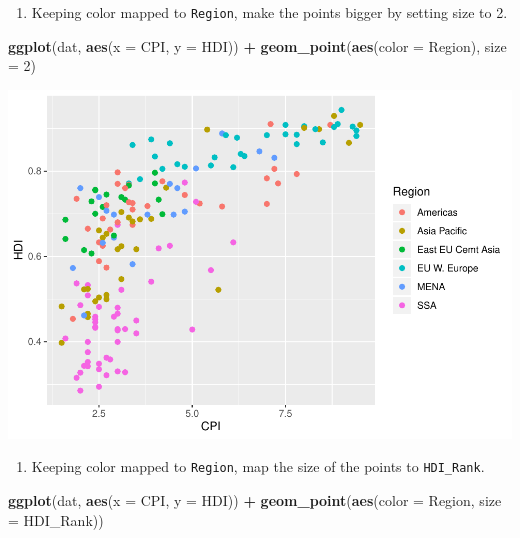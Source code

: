 \documentclass[]{book}
\newenvironment{Shaded}{\begin{snugshade}}{\end{snugshade}}
\newcommand{\DataTypeTok}[1]{\textcolor[rgb]{0.13,0.29,0.53}{#1}}
\newcommand{\DecValTok}[1]{\textcolor[rgb]{0.00,0.00,0.81}{#1}}
\newcommand{\KeywordTok}[1]{\textcolor[rgb]{0.13,0.29,0.53}{\textbf{#1}}}
\newcommand{\NormalTok}[1]{#1}
\newcommand{\OperatorTok}[1]{\textcolor[rgb]{0.81,0.36,0.00}{\textbf{#1}}}
\newcommand{\StringTok}[1]{\textcolor[rgb]{0.31,0.60,0.02}{#1}}
\providecommand{\tightlist}{%
  \setlength{\itemsep}{0pt}\setlength{\parskip}{0pt}}
\begin{document}
\begin{enumerate}
\def\labelenumi{\arabic{enumi}.}
\setcounter{enumi}{3}
\tightlist
\item
  Keeping color mapped to \texttt{Region}, make the points bigger by setting size to 2.
\end{enumerate}

\begin{Shaded}
\begin{Highlighting}[]
\KeywordTok{ggplot}\NormalTok{(dat, }\KeywordTok{aes}\NormalTok{(}\DataTypeTok{x =}\NormalTok{ CPI, }\DataTypeTok{y =}\NormalTok{ HDI)) }\OperatorTok{+}
\StringTok{  }\KeywordTok{geom_point}\NormalTok{(}\KeywordTok{aes}\NormalTok{(}\DataTypeTok{color =}\NormalTok{ Region), }\DataTypeTok{size =} \DecValTok{2}\NormalTok{)}
\end{Highlighting}
\end{Shaded}

\includegraphics{R/Rgraphics/figures/unnamed-chunk-162-1.pdf}

\begin{enumerate}
\def\labelenumi{\arabic{enumi}.}
\setcounter{enumi}{4}
\tightlist
\item
  Keeping color mapped to \texttt{Region}, map the size of the points to \texttt{HDI\_Rank}.
\end{enumerate}

\begin{Shaded}
\begin{Highlighting}[]
\KeywordTok{ggplot}\NormalTok{(dat, }\KeywordTok{aes}\NormalTok{(}\DataTypeTok{x =}\NormalTok{ CPI, }\DataTypeTok{y =}\NormalTok{ HDI)) }\OperatorTok{+}
\KeywordTok{geom_point}\NormalTok{(}\KeywordTok{aes}\NormalTok{(}\DataTypeTok{color =}\NormalTok{ Region, }\DataTypeTok{size =}\NormalTok{  HDI_Rank))}
\end{Highlighting}
\end{Shaded}
\end{document}
